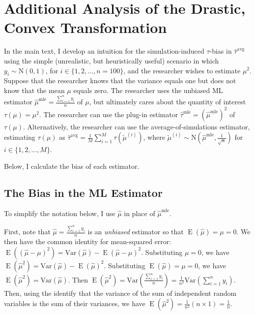 \documentclass[12pt]{article}
\DeclareMathOperator*{\E}{\text{E}}
\begin{document}
\newpage

\section{Additional Analysis of the Drastic, Convex Transformation}\label{appendix:drastic-analysis}

\onehalfspace

In the main text, I develop an intuition for the simulation-induced $\tau$-bias in $\hat{\tau}^\text{avg}$ using the simple (unrealistic, but heuristically useful) scenario in which $y_i \sim \text{N}(0, 1)$, for $i \in \{1, 2, \ldots, n = 100\}$, and the researcher wishes to estimate $\mu^2$. Suppose that the researcher knows that the variance equals one but does not know that the mean $\mu$ equals zero. The researcher uses the unbiased ML estimator $\hat{\mu}^\text{mle} = \frac{\sum_{i=1}^n y_i}{n}$ of $\mu$, but ultimately cares about the quantity of interest $\tau(\mu) = \mu^2$. The researcher can use the plug-in estimator $\hat{\tau}^\text{mle} = \left( \hat{\mu}^\text{mle} \right) ^2$ of $\tau(\mu)$. Alternatively, the researcher can use the average-of-simulations estimator, estimating $\tau(\mu)$ as $\hat{\tau}^\text{avg} = \frac{1}{M} \sum_{i = 1}^M \tau \left( \tilde{\mu}^{(i)} \right)$, where $\tilde{\mu}^{(i)} \sim \text{N} \left( \hat{\mu}^\text{mle}, \frac{1}{\sqrt{n}} \right)$ for $i \in \{1, 2,\ldots, M\}$.

Below, I calculate the bias of each estimator.

\subsection{The Bias in the ML Estimator}

To simplify the notation below, I use $\hat{\mu}$ in place of $\hat{\mu}^\text{mle}$.

First, note that $\hat{\mu}= \frac{\sum_{i=1}^n y_i}{n}$ is an \textit{unbiased} estimator so that $\E(\hat{\mu}) = \mu = 0$. We then have the common identity for mean-squared error: $\E\left( (\hat{\mu} - \mu)^2 \right) = \text{Var}\left(\hat{\mu}\right) - \E(\hat{\mu} - \mu)^2$. Substituting $\mu = 0$, we have $\E\left( \hat{\mu}^2 \right) = \text{Var}\left(\hat{\mu}\right) - \E(\hat{\mu})^2$. Substituting $\E(\hat{\mu}) = \mu = 0$, we have $\E\left( \hat{\mu}^2 \right) = \text{Var}\left(\hat{\mu}\right)$. Then $\E\left( \hat{\mu}^2 \right) = \text{Var}\left( \frac{\sum_{i=1}^n y_i}{n} \right) = \frac{1}{n^2} \text{Var}\left(\sum_{i=1}^n y_i \right)$. Then, using the identify that the variance of the sum of independent random variables is the sum of their variances, we have  $\E\left( \hat{\mu}^2 \right) = \frac{1}{n^2}  (n \times 1) = \frac{1}{n}$.
\end{document}
